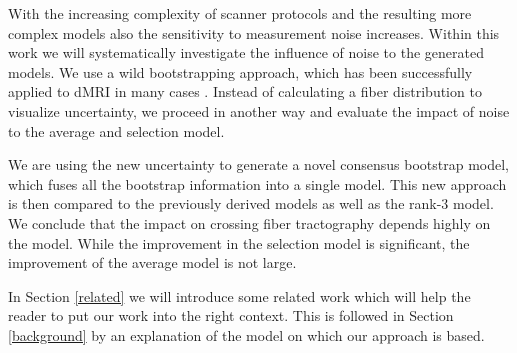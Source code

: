 With the increasing complexity of scanner protocols and the resulting more
complex models also the sensitivity to measurement noise increases. Within this work
we will systematically investigate the influence of noise to the generated
models. We use a wild bootstrapping approach, which has been
successfully applied to dMRI in many cases \cite{Jones:2008}. Instead of
calculating a fiber distribution to visualize uncertainty, we proceed in
another way and evaluate the impact of noise to the average and selection model.

We are using the new uncertainty to generate a novel consensus bootstrap
model, which fuses all the bootstrap information into a single model. This new
approach is then compared to the previously derived models as well as the
rank-$3$ model. We conclude that the
impact on crossing fiber tractography depends highly on the model. While the
improvement in the selection model is significant, the improvement of the
average model is not large. 

In Section \ref{related} we will introduce some related work which will help the
reader to put our work into the right context. This is followed in Section \ref{background} by an
explanation of the model on which our approach is based.
